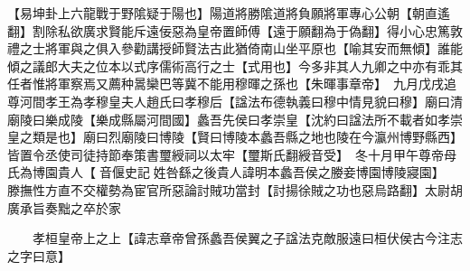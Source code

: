【易坤卦上六龍戰于野隂疑于陽也】陽道將勝隂道將負願將軍專心公朝【朝直遙翻】割除私欲廣求賢能斥遠佞惡為皇帝置師傅【遠于願翻為于偽翻】得小心忠篤敦禮之士將軍與之俱入參勸講授師賢法古此猶倚南山坐平原也【喻其安而無傾】誰能傾之議郎大夫之位本以式序儒術高行之士【式用也】今多非其人九卿之中亦有乖其任者惟將軍察焉又薦种暠欒巴等冀不能用穆暉之孫也【朱暉事章帝】　九月戊戌追尊河間孝王為孝穆皇夫人趙氏曰孝穆后【諡法布德執義曰穆中情見貌曰穆】廟曰清廟陵曰樂成陵【樂成縣屬河間國】蠡吾先侯曰孝崇皇【沈約曰諡法所不載者如孝崇皇之類是也】廟曰烈廟陵曰博陵【賢曰博陵本蠡吾縣之地也陵在今瀛州博野縣西】皆置令丞使司徒持節奉策書璽綬祠以太牢【璽斯氏翻綬音受】　冬十月甲午尊帝母氏為博園貴人【音偃史記姓咎繇之後貴人諱明本蠡吾侯之媵妾博園博陵寢園】　滕撫性方直不交權勢為宦官所惡論討賊功當封【討揚徐賊之功也惡烏路翻】太尉胡廣承旨奏黜之卒於家

　　孝桓皇帝上之上【諱志章帝曾孫蠡吾侯翼之子諡法克敵服遠曰桓伏侯古今注志之字曰意】

